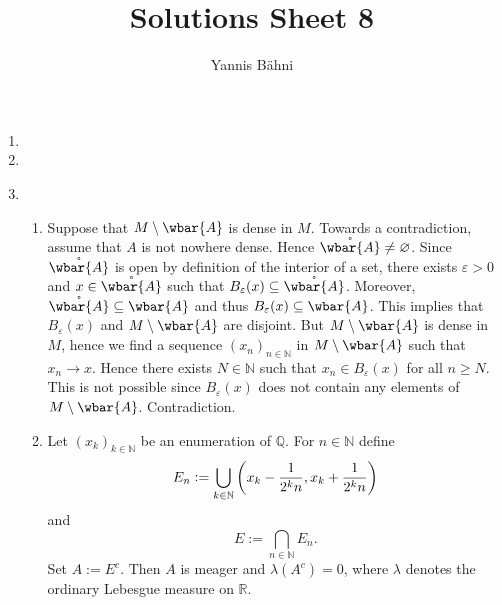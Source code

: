 

\title{Solutions Sheet 8}
\author{Yannis B\"{a}hni}
\address[Yannis B\"{a}hni]{University of Zurich, R\"{a}mistrasse 71, 8006 Zurich}



\maketitle
\thispagestyle{fancy}

\setcounter{section}{1}

\begin{enumerate}[label = \textbf{Exercise \arabic*.},wide = 0pt, itemsep = 1.5ex]
	\item
	\item
	\item 
		~
		\begin{enumerate}[label = \textbf{\alph*.},wide = 0pt, itemsep = 1.5ex]
			\item Suppose that $M \setminus \wbar{A}$ is dense in $M$. Towards a contradiction, assume that $A$ is not nowhere dense. Hence $\mathring{\wbar{A}} \neq \varnothing$. Since $\mathring{\wbar{A}}$ is open by definition of the interior of a set, there exists $\varepsilon > 0$ and $x \in \mathring{\wbar{A}}$ such that $B_\varepsilon(x) \subseteq \mathring{\wbar{A}}$. Moreover, $\mathring{\wbar{A}} \subseteq \wbar{A}$ and thus $B_\varepsilon(x) \subseteq \wbar{A}$. This implies that $B_\varepsilon(x)$ and $M \setminus \wbar{A}$ are disjoint. But $M \setminus \wbar{A}$ is dense in $M$, hence we find a sequence $(x_n)_{n \in \mathbb{N}}$ in $M \setminus \wbar{A}$ such that $x_n \to x$. Hence there exists $N \in \mathbb{N}$ such that $x_n \in B_\varepsilon(x)$ for all $n \geq N$. This is not possible since $B_\varepsilon(x)$ does not contain any elements of $M \setminus \wbar{A}$. Contradiction. 

			\item 
				\begin{lemma}
					Let $(x_k)_{k \in \mathbb{N}}$ be an enumeration of $\mathbb{Q}$. For $n \in \mathbb{N}$ define
					\begin{equation}
						E_n := \bigcup_{k \in \mathbb{N}} \intoo[3]{x_k - \frac{1}{2^kn},x_k + \frac{1}{2^kn}}
					\end{equation}
					\noindent and
					\begin{equation}
						E := \bigcap_{n \in \mathbb{N}} E_n.
					\end{equation}
					Set $A := E^c$. Then $A$ is meager and $\lambda(A^c) = 0$, where $\lambda$ denotes the ordinary Lebesgue measure on $\mathbb{R}$. 
				\end{lemma}


\end{enumerate}
\end{enumerate}
